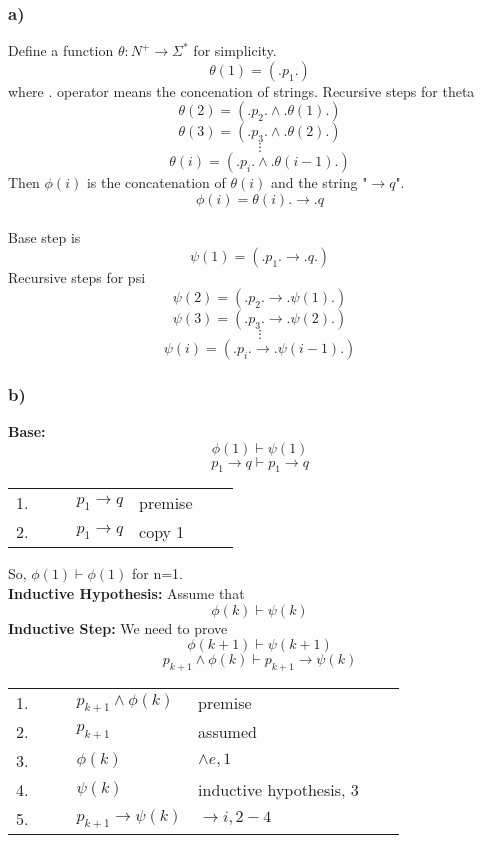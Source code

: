 \documentclass[12pt]{article}
\begin{document}
\subsubsection*{a)}
Define a function $\theta:N^+\rightarrow \Sigma^*$ for simplicity.
$$\theta (1)=(.p_1.)$$ 
where . operator means the concenation of strings. Recursive steps for theta
$$\theta (2)=(.p_2.\wedge .\theta(1).)$$
$$\theta (3)=(.p_3.\wedge .\theta(2).)$$
$$\vdots$$
$$\theta (i)=(.p_i.\wedge .\theta(i-1).)$$
Then $\phi (i)$ is the concatenation of $\theta (i)$ and the string "$\rightarrow q$".
$$\phi (i)=\theta (i).\rightarrow .q$$
\\
Base step is
$$\psi (1) = (.p_1.\rightarrow . q.)$$
Recursive steps for psi
$$\psi (2) = (.p_2.\rightarrow .\psi (1).)$$
$$\psi (3) = (.p_3.\rightarrow .\psi (2).)$$
$$\vdots$$
$$\psi (i) = (.p_i.\rightarrow .\psi (i-1).)$$
\subsubsection*{b)}
\textbf{Base:} 
$$\phi (1)\vdash \psi (1)$$
$$p_1\rightarrow q \vdash p_1\rightarrow q$$
\begin{table}[H]
	\centering
	\begin{tabular}{lllllll}
		1. & & & $p_1\rightarrow q$ & premise & & \\
		2. & & & $p_1\rightarrow q$ & copy 1 & & \\  		
	\end{tabular}
\end{table}
So, $\phi (1)\vdash \phi (1)$ for n=1.\\
\textbf{Inductive Hypothesis:}
Assume that $$\phi (k)\vdash \psi (k)$$
\textbf{Inductive Step:} We need to prove
$$\phi (k+1)\vdash \psi (k+1)$$
$$p_{k+1}\wedge \phi (k)\vdash p_{k+1}\rightarrow \psi (k)$$
\begin{table}[H]
	\centering
	\begin{tabular}{lllllll}
		1. & & & $p_{k+1}\wedge \phi (k)$ & premise & & \\ \cline{3-7}
		2. & \multicolumn{1}{c|}{} & & $p_{k+1}$ & assumed & & \multicolumn{1}{c|}{}\\ 
		3. & \multicolumn{1}{c|}{} & & $\phi (k)$ & $\wedge e,1$ & & \multicolumn{1}{c|}{}\\ 
		4. & \multicolumn{1}{c|}{} & & $\psi (k)$ & inductive hypothesis, 3& & \multicolumn{1}{c|}{}\\ \cline{3-7}
		5. &  & & $p_{k+1}\rightarrow \psi (k)$ & $\rightarrow i, 2-4$ & & \\		
	\end{tabular}
\end{table}
\end{document}
